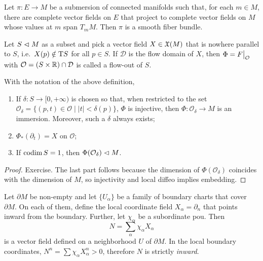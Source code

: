 \begin{cor}[Ehresmann (1961)]\label{thm Ehresmann vector fields}
    Let $\pi:E\to M$ be a submersion of connected manifolds such that, for each $m\in M$, there are complete vector fields on $E$ that project to complete vector fields on $M$ whose values at $m$ span $T_m M$. Then $\pi$ is a smooth fiber bundle.
\end{cor}



\begin{defn}
Let $S\vartriangleleft M$ as a subset and pick a vector field $X\in\mathfrak{X}(M)$ that is nowhere parallel to $S$, i.e.\ $X(p)\notin \mathrm{T} S$ for all $p\in S$. If $\mathcal{D}$ is the flow domain of $X$, then $\Phi=\restr{F}{\mathcal{O}}$ with $\mathcal{O}=(S\times\mathbb{R} )\cap \mathcal{D}$ is called a flow-out of $S$.
\end{defn}

\begin{thm}
With the notation of the above definition,
\begin{enumerate}
    \item If $\delta:S\to [0,+\infty)$ is chosen so that, when restricted to the set $\mathcal{O}_\delta=\{(p,t)\in\mathcal{O}\mid |t|<\delta(p)\}$, $\Phi$ is injective, then $\Phi:\mathcal{O}_\delta\to M$ is an immersion. Moreover, such a $\delta$ always exists;
    \item $\Phi_\ast (\partial_t)=X$ on $\mathcal{O}$;
    \item If $\operatorname{codim} S=1$, then $\Phi(\mathcal{O}_\delta)\vartriangleleft M$.
\end{enumerate}
\end{thm}
\begin{proof}
    Exercise. The last part follows because the dimension of $\Phi(\mathcal{O}_\delta)$ coincides with the dimension of $M$, so injectivity and local diffeo implies embedding.
\end{proof}

Let $\partial M$ be non-empty and let $\{U_\alpha\}$ be a family of boundary charts that cover $\partial M$. On each of them, define the local coordinate field $X_\alpha=\partial_n$ that points inward from the boundary. Further, let $\chi_\alpha$ be a subordinate \gls{pou}. Then 
\[N=\sum_\alpha \chi_\alpha X_\alpha\]
is a vector field defined on a neighborhood $U$ of $\partial M$. In the local boundary coordinates, $N^n=\sum \chi_\alpha X_\alpha^n>0$, therefore $N$ is strictly \emph{inward}.

